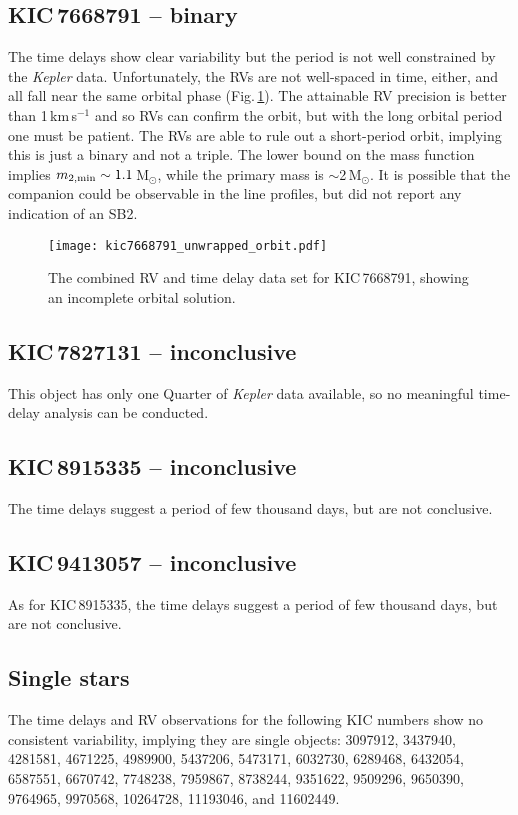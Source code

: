 \documentclass[a4paper,fleqn,usenatbib]{mnras}
\begin{document}
\subsection{KIC\,7668791 -- binary}
The time delays show clear variability but the period is not well constrained by the \textit{Kepler} data. Unfortunately, the RVs are not well-spaced in time, either, and all fall near the same orbital phase (Fig.\,\ref{fig:7668791}). The attainable RV precision is better than 1\,km\,s$^{-1}$ and so RVs can confirm the orbit, but with the long orbital period one must be patient. The RVs are able to rule out a short-period orbit, implying this is just a binary and not a triple. The lower bound on the mass function implies $m_{\rm 2,min} \sim 1.1$\,M$_{\odot}$, while the primary mass is $\sim$2\,M$_{\odot}$. It is possible that the companion could be observable in the line profiles, but \citeauthor{lampensetal2017} did not report any indication of an SB2.

\begin{figure}
\begin{center}
\texttt{[image: kic7668791\_unwrapped\_orbit.pdf]}
\caption{The combined RV and time delay data set for KIC\,7668791, showing an incomplete orbital solution.}
\label{fig:7668791}
\end{center}
\end{figure}


\subsection{KIC\,7827131 -- inconclusive}
This object has only one Quarter of \textit{Kepler} data available, so no meaningful time-delay analysis can be conducted.


\subsection{KIC\,8915335 -- inconclusive}
The time delays suggest a period of few thousand days, but are not conclusive.


\subsection{KIC\,9413057 -- inconclusive}
As for KIC\,8915335, the time delays suggest a period of few thousand days, but are not conclusive.


\subsection{Single stars}
The time delays and RV observations for the following KIC numbers show no consistent variability, implying they are single objects:
3097912,
3437940,
4281581,
4671225,
4989900,
5437206,
5473171,
6032730,
6289468,
6432054,
6587551,
6670742,
7748238,
7959867,
8738244,
9351622,
9509296,
9650390,
9764965,
9970568,
10264728,
11193046, and
11602449.



\end{document}
